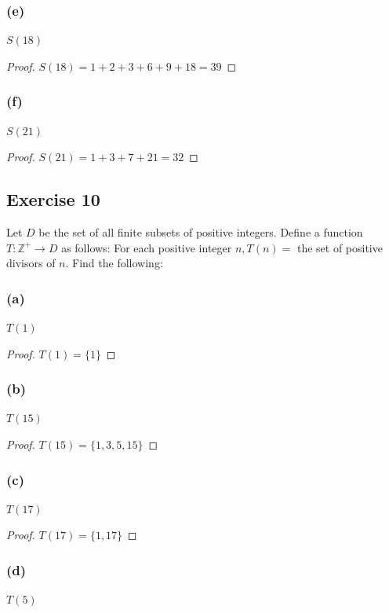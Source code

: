 \documentclass[14pt]{extarticle}
\newcommand{\Z}{\mathbb{Z}}
\begin{document}
\subsubsection{(e)}
$S(18)$

\begin{proof}
\(S(18) = 1 + 2 + 3 + 6 + 9 + 18 = 39\)
\end{proof}

\subsubsection{(f)}
$S(21)$

\begin{proof}
\(S(21) = 1 + 3 + 7 + 21 = 32\)
\end{proof}

\subsection{Exercise 10}
Let $D$ be the set of all finite subsets of positive integers. Define a function \(T: \Z^+ \to D\) as follows: 
For each positive integer \(n, T(n) =\) the set of positive divisors of $n$. Find the following:

\subsubsection{(a)}
$T(1)$

\begin{proof}
\(T(1) = \{1\}\)

\end{proof}

\subsubsection{(b)}
$T(15)$

\begin{proof}
\(T(15) = \{1, 3, 5, 15\}\)
\end{proof}

\subsubsection{(c)}
$T(17)$

\begin{proof}
\(T(17) = \{1, 17\}\)
\end{proof}

\subsubsection{(d)}
$T(5)$
\end{document}
